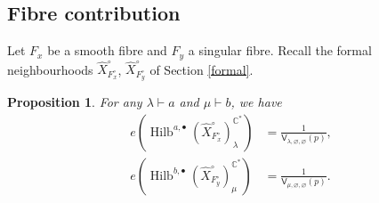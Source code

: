 \documentclass{amsart}
\newtheorem{proposition}[theorem]{Proposition}
\theoremstyle{definition}
\newcommand{\CC} {\mathbb{C}}          %
\newcommand{\sfV}{\mathsf{V}}
\newcommand{\Hilb}{\operatorname{Hilb}}
\begin{document}
\subsection{Fibre contribution}

Let $F_x$ be a smooth fibre and $F_y$ a singular fibre. Recall the formal neighbourhoods $\widehat{X}^{\circ}_{F_{x}^{\circ}}$,  $\widehat{X}^{\circ}_{F_{y}^{\circ}}$ of Section \ref{formal}.
\begin{proposition} \label{vertex2}
For any $\lambda \vdash a$ and $\mu \vdash b$, we have
\begin{align*}
e(\Hilb^{a,\bullet}(\widehat{X}^{\circ}_{F_{x}^{\circ}})_{\lambda}^{\CC^*}) &= \frac{1}{\sfV_{\lambda,\varnothing,\varnothing}(p)}, \\
e(\Hilb^{b,\bullet}(\widehat{X}^{\circ}_{F_{y}^{\circ}})_{\mu}^{\CC^*}) &= \frac{1}{\sfV_{\mu,\varnothing,\varnothing}(p)}.
\end{align*}
\end{proposition}
\end{document}
